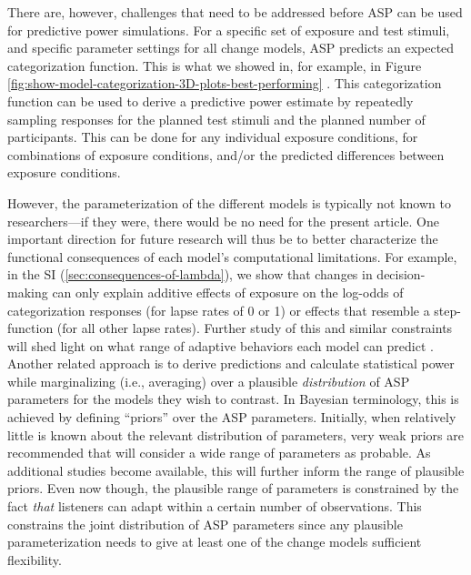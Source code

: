\documentclass[
  11pt,
  man,floatsintext]{apa6}
\begin{document}
There are, however, challenges that need to be addressed before ASP can be used for predictive power simulations. For a specific set of exposure and test stimuli, and specific parameter settings for all change models, ASP predicts an expected categorization function. This is what we showed in, for example, in Figure \ref{fig:show-model-categorization-3D-plots-best-performing} \autocites[see also, e.g.,][]{tan2021,theodore-monto2019}[ for similar approaches]{xie2021cognition}. This categorization function can be used to derive a predictive power estimate by repeatedly sampling responses for the planned test stimuli and the planned number of participants. This can be done for any individual exposure conditions, for combinations of exposure conditions, and/or the predicted differences between exposure conditions.

However, the parameterization of the different models is typically not known to researchers---if they were, there would be no need for the present article. One important direction for future research will thus be to better characterize the functional consequences of each model's computational limitations. For example, in the SI (\ref{sec:consequences-of-lambda}), we show that changes in decision-making can only explain additive effects of exposure on the log-odds of categorization responses (for lapse rates of 0 or 1) or effects that resemble a step-function (for all other lapse rates). Further study of this and similar constraints will shed light on what range of adaptive behaviors each model can predict \autocites[for discussions of global, qualitative model comparisons, see][]{pitt2006,apfelbaum-mcmurray2015}. Another related approach is to derive predictions and calculate statistical power while marginalizing (i.e., averaging) over a plausible \emph{distribution} of ASP parameters for the models they wish to contrast. In Bayesian terminology, this is achieved by defining ``priors'' over the ASP parameters. Initially, when relatively little is known about the relevant distribution of parameters, very weak priors are recommended that will consider a wide range of parameters as probable. As additional studies become available, this will further inform the range of plausible priors. Even now though, the plausible range of parameters is constrained by the fact \emph{that} listeners can adapt within a certain number of observations. This constrains the joint distribution of ASP parameters since any plausible parameterization needs to give at least one of the change models sufficient flexibility.
\end{document}
